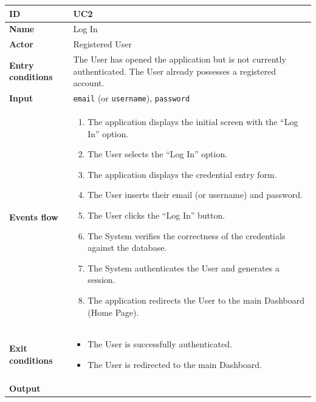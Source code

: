 \begin{table}[H]
\centering
\begin{tabularx}{\textwidth}{|m{3.5cm}|X|}
\hline
\textbf{ID} & UC2 \\ \hline
\textbf{Name} & Log In \\ \hline
\textbf{Actor} & Registered User \\ \hline
\textbf{Entry conditions} & The User has opened the application but is not currently authenticated. The User already possesses a registered account. \\ \hline
\textbf{Input} & \texttt{email} (or \texttt{username}), \texttt{password} \\ \hline
\textbf{Events flow} & 
    \begin{enumerate}[nosep, leftmargin=*, before=\vspace{0.3em}, after=\vspace{0.3em}]
        \item The application displays the initial screen with the ``Log In'' option.
        \item The User selects the ``Log In'' option.
        \item The application displays the credential entry form.
        \item The User inserts their email (or username) and password.
        \item The User clicks the ``Log In'' button.
        \item The System verifies the correctness of the credentials against the database.
        \item The System authenticates the User and generates a session.
        \item The application redirects the User to the main Dashboard (Home Page).
    \end{enumerate} 
    \\ \hline
\textbf{Exit conditions} & 
    \begin{itemize}[nosep, leftmargin=*, before=\vspace{0.3em}, after=\vspace{0.3em}]
        \item The User is successfully authenticated.
        \item The User is redirected to the main Dashboard.
    \end{itemize}
    \\ \hline
\textbf{Output} & 
    \begin{itemize}[nosep, leftmargin=*, before=\vspace{0.3em}, after=\vspace{0.3em}]

\end{itemize}
\end{tabularx}
\end{table}

